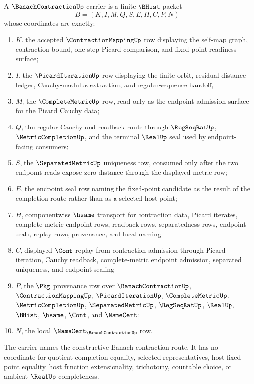 \begin{definition}
\label{def:banach-contraction-iteration-carrier}
A $\BanachContractionUp$ carrier is a finite $\BHist$ packet
$$
B=(K,I,M,Q,S,E,H,C,P,N)
$$
whose coordinates are exactly:
\begin{enumerate}
\item $K$, the accepted $\ContractionMappingUp$ row displaying the self-map graph, contraction bound, one-step Picard comparison, and fixed-point readiness surface;
\item $I$, the $\PicardIterationUp$ row displaying the finite orbit, residual-distance ledger, Cauchy-modulus extraction, and regular-sequence handoff;
\item $M$, the $\CompleteMetricUp$ row, read only as the endpoint-admission surface for the Picard Cauchy data;
\item $Q$, the regular-Cauchy and readback route through $\RegSeqRatUp$, $\MetricCompletionUp$, and the terminal $\RealUp$ seal used by endpoint-facing consumers;
\item $S$, the $\SeparatedMetricUp$ uniqueness row, consumed only after the two endpoint reads expose zero distance through the displayed metric row;
\item $E$, the endpoint seal row naming the fixed-point candidate as the result of the completion route rather than as a selected host point;
\item $H$, componentwise $\hsame$ transport for contraction data, Picard iterates, complete-metric endpoint rows, readback rows, separatedness rows, endpoint seals, replay rows, provenance, and local naming;
\item $C$, displayed $\Cont$ replay from contraction admission through Picard iteration, Cauchy readback, complete-metric endpoint admission, separated uniqueness, and endpoint sealing;
\item $P$, the $\Pkg$ provenance row over $\BanachContractionUp$, $\ContractionMappingUp$, $\PicardIterationUp$, $\CompleteMetricUp$, $\MetricCompletionUp$, $\SeparatedMetricUp$, $\RegSeqRatUp$, $\RealUp$, $\BHist$, $\hsame$, $\Cont$, and $\NameCert$;
\item $N$, the local $\NameCert_{\BanachContractionUp}$ row.
\end{enumerate}
The carrier names the constructive Banach contraction route. It has no coordinate for quotient completion equality, selected representatives, host fixed-point equality, host function extensionality, trichotomy, countable choice, or ambient $\RealUp$ completeness.
\end{definition}

